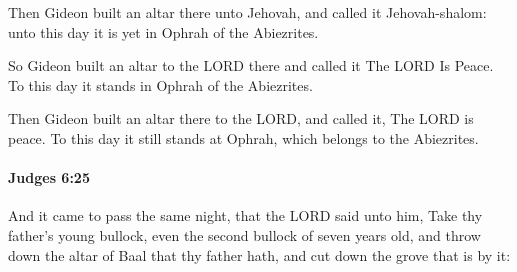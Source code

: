 			\begin{versebox}
					\item[BHS] 
					\item[ASV] Then Gideon built an altar there unto Jehovah, and called it Jehovah-shalom: unto this day it is yet in Ophrah of the Abiezrites.
					\item[NIV] So Gideon built an altar to the LORD there and called it The LORD Is Peace. To this day it stands in Ophrah of the Abiezrites.
					\item[NRSV] Then Gideon built an altar there to the LORD, and called it, The LORD is peace. To this day it still stands at Ophrah, which belongs to the Abiezrites.
			\end{versebox}

		\paragraph{Judges 6:25} %
			\label{JUDGES-6-25}

			And it came to pass the same night, that the LORD said unto him, Take thy father’s young bullock, even the second bullock of seven years old, and throw down the altar of Baal that thy father hath, and cut down the grove that is by it:

